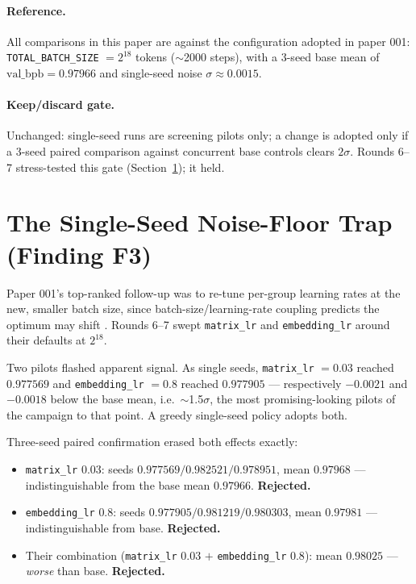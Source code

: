 \documentclass{article}
\newcommand{\valbpb}{\mathrm{val\_bpb}}
\begin{document}
\paragraph{Reference.} All comparisons in this paper are against the configuration adopted in paper 001: \texttt{TOTAL\_BATCH\_SIZE} $= 2^{18}$ tokens ($\sim$2000 steps), with a 3-seed base mean of $\valbpb = 0.97966$ and single-seed noise $\sigma \approx 0.0015$.

\paragraph{Keep/discard gate.} Unchanged: single-seed runs are screening pilots only; a change is adopted only if a 3-seed paired comparison against concurrent base controls clears $2\sigma$. Rounds 6--7 stress-tested this gate (Section~\ref{sec:noisefloor}); it held.

\section{The Single-Seed Noise-Floor Trap (Finding F3)}
\label{sec:noisefloor}

Paper 001's top-ranked follow-up was to re-tune per-group learning rates at the new, smaller batch size, since batch-size/learning-rate coupling predicts the optimum may shift \cite{mccandlish2018empirical}. Rounds 6--7 swept \texttt{matrix\_lr} and \texttt{embedding\_lr} around their defaults at $2^{18}$.

Two pilots flashed apparent signal. As single seeds, \texttt{matrix\_lr} $= 0.03$ reached $0.977569$ and \texttt{embedding\_lr} $= 0.8$ reached $0.977905$ --- respectively $-0.0021$ and $-0.0018$ below the base mean, i.e.\ $\sim$1.5$\sigma$, the most promising-looking pilots of the campaign to that point. A greedy single-seed policy adopts both.

Three-seed paired confirmation erased both effects exactly:

\begin{itemize}
    \item \texttt{matrix\_lr} $0.03$: seeds $0.977569 / 0.982521 / 0.978951$, mean $\mathbf{0.97968}$ --- indistinguishable from the base mean $0.97966$. \textbf{Rejected.}
    \item \texttt{embedding\_lr} $0.8$: seeds $0.977905 / 0.981219 / 0.980303$, mean $\mathbf{0.97981}$ --- indistinguishable from base. \textbf{Rejected.}
    \item Their combination (\texttt{matrix\_lr} $0.03$ $+$ \texttt{embedding\_lr} $0.8$): mean $\mathbf{0.98025}$ --- \emph{worse} than base. \textbf{Rejected.}
\end{itemize}
\end{document}
